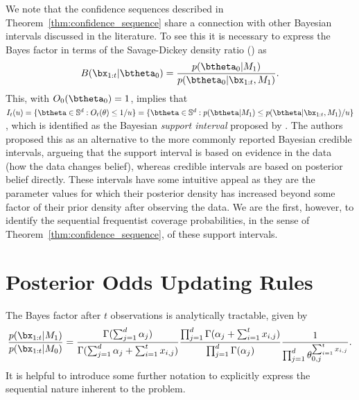 \documentclass[11pt]{article}
\begin{document}
We note that the confidence sequences described in Theorem~\ref{thm:confidence_sequence} share a connection with other Bayesian intervals discussed in the literature.
To see this it is necessary to express the Bayes factor in terms of the Savage-Dickey density ratio (\cite{dickey}) as
\begin{equation}
    B(\bx_{1:t}|\btheta_0) = \frac{p(\btheta_0| M_1)}{p(\btheta_0|\bx_{1:t},M_1)}.
\end{equation}
This, with $O_0(\btheta_0)=1$, implies that $I_t(u) = \lbrace \btheta \in \mathbb{S}^d : O_t(\theta) \leq 1/u \rbrace = \lbrace \btheta  \in \mathbb{S}^d : p(\btheta| M_1)\leq p(\btheta|\bx_{1:t}, M_1)/u \rbrace $, which is identified as the Bayesian \textit{support interval} proposed by \cite{support_interval}.
The authors proposed this as an alternative to the more commonly reported Bayesian credible intervals, argueing that the support interval is based on evidence in the data (how the data changes belief), whereas credible intervals are based on posterior belief directly.
These intervals have some intuitive appeal as they are the parameter values for which their posterior density has increased beyond some factor of their prior density after observing the data.
We are the first, however, to identify the sequential frequentist coverage probabilities, in the sense of Theorem~\ref{thm:confidence_sequence}, of these support intervals.






\appendix
\section{Posterior Odds Updating Rules}
\label{app:posterior_odds}
The Bayes factor after $t$ observations is analytically tractable, given by
\begin{equation}
  \label{eq:bayes_factor}
 \frac{p(\bx_{1:t}|M_1)}{p(\bx_{1:t}|M_0)} = \frac{\Gamma(\sum_{j=1}^{d} \alpha_j)}{\Gamma(\sum_{j=1}^{d} \alpha_j + \sum_{i=1}^{t}x_{i,j})}\frac{\prod_{j=1}^{d}\Gamma(\alpha_j + \sum_{i=1}^{t}x_{i,j} )}{\prod_{j=1}^{d}\Gamma(\alpha_j )}\frac{1}{\prod_{j=1}^{d} \theta_{0,j}^{\sum_{i=1}^{t}x_{i,j}}}.
\end{equation}
It is helpful to introduce some further notation to explicitly express the sequential nature inherent to the problem.
\end{document}
